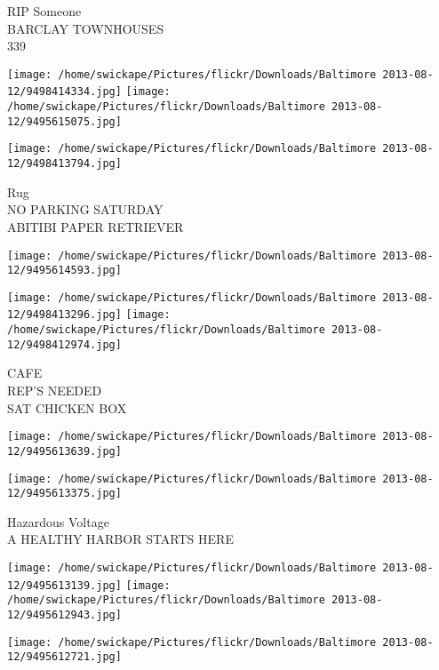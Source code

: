 \documentclass[10pt,letterpaper]{article}
\begin{document}
RIP Someone\\
BARCLAY TOWNHOUSES\\
339\\
\pagebreak

\texttt{[image: /home/swickape/Pictures/flickr/Downloads/Baltimore 2013-08-12/9498414334.jpg]}
\texttt{[image: /home/swickape/Pictures/flickr/Downloads/Baltimore 2013-08-12/9495615075.jpg]}

\vspace{0.25in}
\texttt{[image: /home/swickape/Pictures/flickr/Downloads/Baltimore 2013-08-12/9498413794.jpg]}

Rug\\
NO PARKING SATURDAY\\
ABITIBI PAPER RETRIEVER\\
\pagebreak

\texttt{[image: /home/swickape/Pictures/flickr/Downloads/Baltimore 2013-08-12/9495614593.jpg]}

\vspace{0.25in}
\texttt{[image: /home/swickape/Pictures/flickr/Downloads/Baltimore 2013-08-12/9498413296.jpg]}
\texttt{[image: /home/swickape/Pictures/flickr/Downloads/Baltimore 2013-08-12/9498412974.jpg]}

CAFE\\
REP'S NEEDED\\
SAT CHICKEN BOX\\
\pagebreak

\texttt{[image: /home/swickape/Pictures/flickr/Downloads/Baltimore 2013-08-12/9495613639.jpg]}

\vspace{0.25in}
\texttt{[image: /home/swickape/Pictures/flickr/Downloads/Baltimore 2013-08-12/9495613375.jpg]}

Hazardous Voltage\\
A HEALTHY HARBOR STARTS HERE\\
\pagebreak

\texttt{[image: /home/swickape/Pictures/flickr/Downloads/Baltimore 2013-08-12/9495613139.jpg]}
\texttt{[image: /home/swickape/Pictures/flickr/Downloads/Baltimore 2013-08-12/9495612943.jpg]}

\vspace{0.25in}
\texttt{[image: /home/swickape/Pictures/flickr/Downloads/Baltimore 2013-08-12/9495612721.jpg]}
\end{document}
